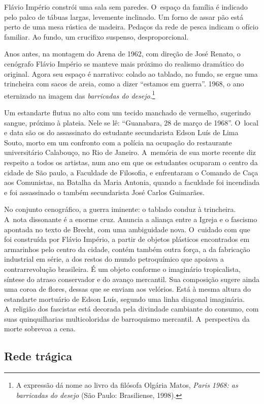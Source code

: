 {Flávio Império constrói uma sala sem paredes. O~espaço da família é
indicado pelo palco de tábuas largas, levemente inclinado. Um forno de
assar pão está perto de uma mesa rústica de madeira. Pedaços da rede de
pesca indicam o ofício familiar. Ao fundo, um crucifixo suspenso,
desproporcional.

Anos antes, na montagem do Arena de 1962, com direção de José Renato, o
cenógrafo Flávio Império se manteve mais próximo do realismo dramático
do original. Agora seu espaço é narrativo: colado ao tablado, no fundo,
se ergue uma trincheira com sacos de areia, como a dizer “estamos em
guerra”. 1968, o ano eternizado na imagem das {\it barricadas do
desejo}.\footnote{A expressão dá nome ao livro da filósofa Olgária Matos,
  {\it Paris 1968: as barricadas do desejo} (São Paulo: Brasiliense,
  1998).}

Um estandarte flutua no alto com um tecido manchado de vermelho,
sugerindo sangue, próximo à plateia. Nele se lê: “Guanabara, 28 de março
de 1968”. O~local e data são os do assassinato do estudante
secundarista Edson Luís de Lima Souto, morto em um confronto com a
polícia na ocupação do restaurante universitário Calabouço, no Rio de
Janeiro. A~memória de sua morte recente diz respeito a todos os
artistas, num ano em que os estudantes ocuparam o centro da cidade de
São paulo, a Faculdade de Filosofia, e enfrentaram o Comando de Caça aos
Comunistas, na Batalha da Maria Antonia, quando a faculdade foi
incendiada e foi assassinado o também secundarista José Carlos
Guimarães.

No conjunto cenográfico, a guerra iminente: o tablado conduz à
trincheira. A~nota dissonante é a enorme cruz. Anuncia a aliança entre a
Igreja e o fascismo apontada no texto de Brecht, com uma ambiguidade
nova. O~cuidado com que foi construída por Flávio Império, a partir de
objetos plásticos encontrados em armarinhos pelo centro da cidade,
contém também outra força, a da fabricação industrial em série, a dos
restos do mundo petroquímico que apoiava a contrarrevolução brasileira.
É um objeto conforme o imaginário tropicalista, síntese do atraso
conservador e do avanço mercantil. Sua composição sugere ainda uma coroa
de flores, dessas que se enviam aos velórios. Está à mesma altura do
estandarte mortuário de Edson Luís, segundo uma linha diagonal
imaginária. A~religião dos fascistas está decorada pela divindade
cambiante do consumo, com suas quinquilharias multicoloridas de
barroquismo mercantil. A~perspectiva da morte sobrevoa a cena.

\subsection{Rede trágica}

}
